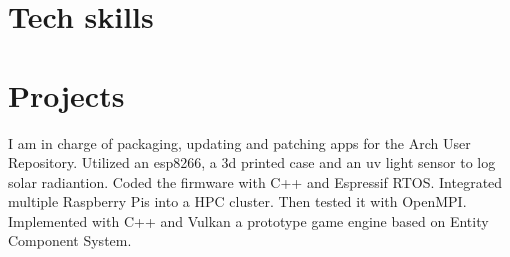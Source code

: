 \documentclass[10pt, a4paper]{moderncv}
\begin{document}
\section{Tech skills}

\section{Projects}
{
	I am in charge of packaging, updating and patching apps for the Arch User Repository.
}
{
	Utilized an esp8266, a 3d printed case and an uv light sensor to log solar radiantion. Coded the firmware with C++ and Espressif RTOS.
}
{
	Integrated multiple Raspberry Pis into a HPC cluster.
	Then tested it with OpenMPI.
}
{
	Implemented with C++ and Vulkan a prototype game engine based on Entity Component System.
}


\end{document}
